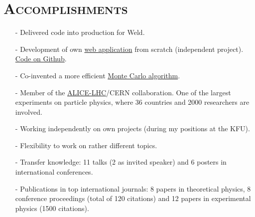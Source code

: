 \documentclass[a4paper, 10pt]{article}
\begin{document}
\vspace*{2mm}
\section{\textsc{Accomplishments}}
\vspace*{1mm}
\begin{itemize}
    \item[-] Delivered code into production for Weld.
    \item[-] Development of own \href{http://wines.e-cisac.com/start/}{web application} from scratch (independent project).  \href{https://github.com/ydelgadom/non_physics}{Code on Github}.\vspace{-1mm}
    \item[-] Co-invented a more efficient \href{http://inspirehep.net/record/1202877}{Monte Carlo algorithm}.
    \vspace{-1mm}
    \item[-] Member of the \href{http://home.web.cern.ch/about/experiments/alice}{ALICE-LHC}/CERN
    collaboration.  One of the largest experiments on particle physics, where 36 countries and 2000 researchers
    are involved.
    \vspace*{-1mm}
    \item[-] Working independently on own projects (during my positions at the KFU).
    \vspace*{-1mm}
    \item[-] Flexibility to work on rather different topics.
     \vspace*{-1mm}
    \item[-] Transfer knowledge: 11 talks (2 as invited speaker) 
    and 6 posters in international conferences.
     \vspace*{-1mm}
    \item[-] Publications in top international journals:
    8 papers in theoretical physics, 8 conference proceedings (total of 120 citations) and 
    12 papers in experimental physics (1500 citations).
\end{itemize}


\newpage
\end{document}
